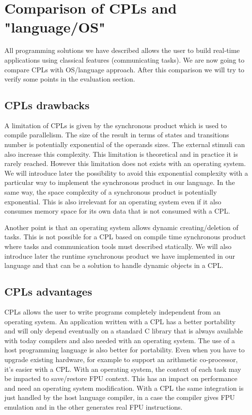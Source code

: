 \documentclass[10pt]{report}
\begin{document}
\section{Comparison of CPLs and "language/OS"}

All programming solutions we have described allows the user to build real-time applications using classical features
(communicating tasks). We are now going to compare CPLs with OS/language approach. After this comparison we will try
to verify some points in the evaluation section.

\subsection{CPLs drawbacks}

A limitation of CPLs is given by the synchronous product which is used to compile parallelism. The size of the result
in terms of states and transitions number is potentially exponential of the operands sizes. The external stimuli can
also increase this complexity. This limitation is theoretical and in practice it is rarely reached. However this limitation
does not exists with an operating system. We will introduce later the possibility to avoid this exponential complexity
with a particular way to implement the synchronous product in our language. In the same way, the space complexity of a
synchronous product is potentially exponential. This is also irrelevant for an operating system even if it also
consumes memory space for its own data that is not consumed with a CPL.

Another point is that an operating system allows dynamic creating/deletion of tasks. This is not possible for a CPL
based on compile time synchronous product where tasks and communication tools must described statically. We will also
introduce later the runtime synchronous product we have implemented in our language and that can be a solution
to handle dynamic objects in a CPL.

\subsection{CPLs advantages}

CPLs allows the user to write programs completely independent from an operating system. An application written with a CPL
has a better portability and will only depend eventually on a standard C library that is always available with today
compilers and also needed with an operating system. The use of a host programming language is also better for portability.
Even when you have to upgrade existing hardware, for example to support an arithmetic co-processor, it's easier with
a CPL. With an operating system, the context of each task may be impacted to save/restore FPU context. This has an
impact on performance and need an operating system modification. With a CPL the same integration is just handled
by the host language compiler, in a case the compiler gives FPU emulation and in the other generates real FPU instructions.
\end{document}
